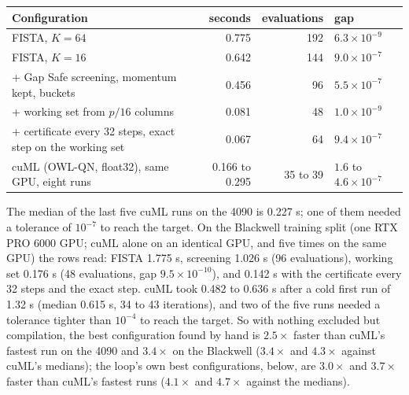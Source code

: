 \documentclass[11pt]{article}
\begin{document}
\begin{center}
\small
\begin{tabular}{lrrl}
\toprule
Configuration & seconds & evaluations & gap \\
\midrule
FISTA, $K=64$ & 0.775 & 192 & $6.3\times10^{-9}$ \\
FISTA, $K=16$ & 0.642 & 144 & $9.0\times10^{-7}$ \\
\quad + Gap Safe screening, momentum kept, buckets & 0.456 & 96 & $5.5\times10^{-7}$ \\
\quad + working set from $p/16$ columns & 0.081 & 48 & $1.0\times10^{-9}$ \\
\quad + certificate every 32 steps, exact step on the working set & 0.067 & 64 & $9.4\times10^{-7}$ \\
cuML (OWL-QN, float32), same GPU, eight runs & 0.166 to 0.295 & 35 to 39 & $1.6$ to $4.6\times10^{-7}$ \\
\bottomrule
\end{tabular}
\end{center}

The median of the last five cuML runs on the 4090 is 0.227 s; one of them
needed a tolerance of $10^{-7}$ to reach the target. On the Blackwell training
split (one RTX PRO 6000 GPU; cuML alone on an identical GPU, and five times on
the same GPU) the rows read: FISTA 1.775 s, screening 1.026 s (96 evaluations),
working set 0.176 s (48 evaluations, gap $9.5\times10^{-10}$), and 0.142 s with
the certificate every 32 steps and the exact step. cuML took 0.482 to 0.636 s
after a cold first run of 1.32 s (median 0.615 s, 34 to 43 iterations), and two
of the five runs needed a tolerance tighter than $10^{-4}$ to reach the target.
So with nothing excluded but compilation, the best configuration found by hand
is $2.5\times$ faster than cuML's fastest run on the 4090 and $3.4\times$ on the
Blackwell ($3.4\times$ and $4.3\times$ against cuML's medians); the loop's own best
configurations, below, are $3.0\times$ and $3.7\times$ faster than cuML's fastest runs
($4.1\times$ and $4.7\times$ against the medians).
\end{document}
